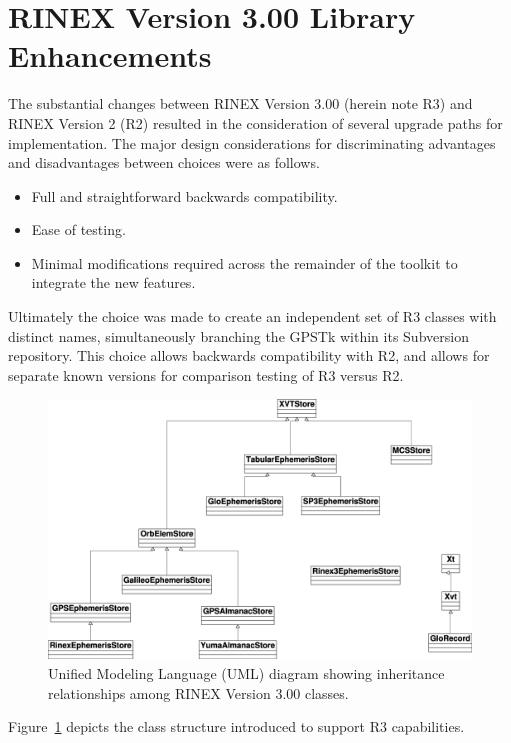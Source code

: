 \section*{RINEX Version 3.00 Library Enhancements}

The substantial changes between RINEX Version 3.00 (herein note R3)
and RINEX Version 2 (R2) resulted in the consideration of several
upgrade paths for implementation. The major design considerations for
discriminating advantages and disadvantages between choices were as
follows.
%
\begin{itemize}
  \item Full and straightforward backwards compatibility.
  \item Ease of testing.
  \item Minimal modifications required across the remainder of the
toolkit to integrate the new features.
\end{itemize}
%

Ultimately the choice was made to create an independent set of R3
classes with distinct names, simultaneously branching the GPSTk within
its Subversion repository.  This choice allows backwards compatibility
with R2, and allows for separate known versions for comparison testing
of R3 versus R2.
%
\begin{figure}
   \centering
   \includegraphics[width=5.5in,bb=79 313 1369 1107]{UML0709.eps}
   \caption{Unified Modeling Language (UML) diagram showing inheritance relationships among RINEX Version 3.00 classes.}
   \label{fig:rinex3}
\end{figure}
%
Figure~\ref{fig:rinex3} depicts the class structure introduced to
support R3 capabilities.

